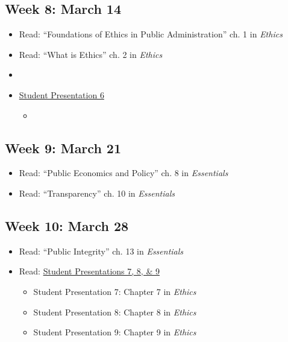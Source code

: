 \documentclass[10pt, letterpaper]{article}
\begin{document}
    \subsection*{Week 8: March 14} 
    \begin{itemize}
        \item Read: ``Foundations of Ethics in Public Administration'' ch. 1 in \emph{Ethics}
        \item Read: ``What is Ethics'' ch. 2 in \emph{Ethics}
        \item \cite{OLEARY2010}
        \item \underline{Student Presentation 6}
        \begin{itemize}
            \item \cite{HOLLIBAUGHJR.2020a}
        \end{itemize}
    \end{itemize}

    \subsection*{Week 9:  March 21} 
    \begin{itemize}
        \item Read: ``Public Economics and Policy'' ch. 8 in \emph{Essentials}
        \item Read: ``Transparency'' ch. 10 in \emph{Essentials}
    \end{itemize}

    \subsection*{Week 10: March 28}
    \begin{itemize}
        \item Read: ``Public Integrity'' ch. 13 in \emph{Essentials}
        \item Read: \underline{Student Presentations 7, 8, \& 9}
        \begin{itemize}
            \item Student Presentation 7: Chapter 7 in \emph{Ethics}
            \item Student Presentation 8: Chapter 8 in \emph{Ethics}
            \item Student Presentation 9: Chapter 9 in \emph{Ethics}
        \end{itemize}
    \end{itemize}
\end{document}
